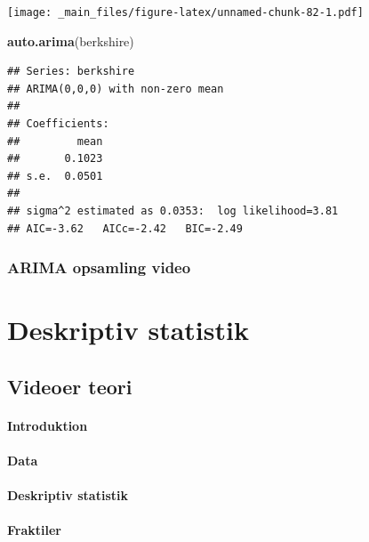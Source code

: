 \documentclass[]{book}
\newenvironment{Shaded}{\begin{snugshade}}{\end{snugshade}}
\newcommand{\KeywordTok}[1]{\textcolor[rgb]{0.13,0.29,0.53}{\textbf{#1}}}
\newcommand{\NormalTok}[1]{#1}
\begin{document}
\texttt{[image: \_main\_files/figure-latex/unnamed-chunk-82-1.pdf]}

\begin{Shaded}
\begin{Highlighting}[]
\KeywordTok{auto.arima}\NormalTok{(berkshire)}
\end{Highlighting}
\end{Shaded}

\begin{verbatim}
## Series: berkshire 
## ARIMA(0,0,0) with non-zero mean 
## 
## Coefficients:
##         mean
##       0.1023
## s.e.  0.0501
## 
## sigma^2 estimated as 0.0353:  log likelihood=3.81
## AIC=-3.62   AICc=-2.42   BIC=-2.49
\end{verbatim}

\hypertarget{arima-opsamling-video}{%
\subsection{ARIMA opsamling video}\label{arima-opsamling-video}}

\hypertarget{deskriptiv-statistik}{%
\chapter{Deskriptiv statistik}\label{deskriptiv-statistik}}

\hypertarget{videoer-teori}{%
\section{Videoer teori}\label{videoer-teori}}

\hypertarget{introduktion}{%
\subsubsection{Introduktion}\label{introduktion}}

\hypertarget{data}{%
\subsubsection{Data}\label{data}}

\hypertarget{deskriptiv-statistik-1}{%
\subsubsection{Deskriptiv statistik}\label{deskriptiv-statistik-1}}

\hypertarget{fraktiler}{%
\subsubsection{Fraktiler}\label{fraktiler}}
\end{document}
